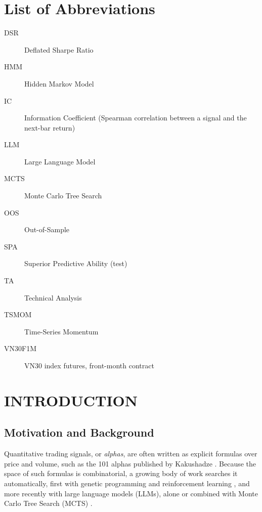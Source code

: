 \documentclass[12pt,a4paper,oneside]{book}
\theoremstyle{definition}
\begin{document}
	\newpage
	\clearpage

	\mainmatter
	\tableofcontents
	\newpage
	\clearpage

\listoffigures
\newpage
\clearpage

\listoftables
\newpage
\clearpage

\chapter*{List of Abbreviations}
\begin{description}
    \item[DSR] Deflated Sharpe Ratio
    \item[HMM] Hidden Markov Model
    \item[IC] Information Coefficient (Spearman correlation between a signal and the next-bar return)
    \item[LLM] Large Language Model
    \item[MCTS] Monte Carlo Tree Search
    \item[OOS] Out-of-Sample
    \item[SPA] Superior Predictive Ability (test)
    \item[TA] Technical Analysis
    \item[TSMOM] Time-Series Momentum
    \item[VN30F1M] VN30 index futures, front-month contract
\end{description}

\clearpage
\newpage
\clearpage

\chapter{INTRODUCTION}
\label{ch1}

\section{Motivation and Background}

Quantitative trading signals, or \emph{alphas}, are often written as explicit formulas over price and volume, such as the 101 alphas published by Kakushadze \cite{kakushadze2016}. Because the space of such formulas is combinatorial, a growing body of work searches it automatically, first with genetic programming \cite{koza1992} and reinforcement learning \cite{yu2023,xu2024}, and more recently with large language models (LLMs), alone \cite{wang2023,tang2025} or combined with Monte Carlo Tree Search (MCTS) \cite{ren2024,shi2026}.
\end{document}
